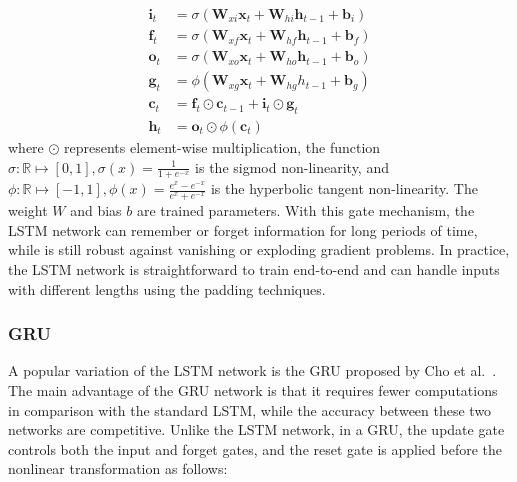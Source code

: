 \begin{equation}
\label{Eq_LSTM} 
\begin{aligned} 
{\mathbf{i}_t} &= \sigma ({\mathbf{W}_{xi}}{\mathbf{x}_t} + {\mathbf{W}_{hi}}{\mathbf{h}_{t - 1}} + {\mathbf{b}_i})\\
{\mathbf{f}_t} &= \sigma ({\mathbf{W}_{xf}}{\mathbf{x}_t} + {\mathbf{W}_{hf}}{\mathbf{h}_{t - 1}} + {\mathbf{b}_f})\\
{\mathbf{o}_t} &= \sigma ({\mathbf{W}_{xo}}{\mathbf{x}_t} + {\mathbf{W}_{ho}}{\mathbf{h}_{t - 1}} + {\mathbf{b}_o})\\
{\mathbf{g}_t} &= \phi ({\mathbf{W}_{xg}}{\mathbf{x}_t} + {\mathbf{W}_{hg}}{h_{t - 1}} + {\mathbf{b}_g})\\
{\mathbf{c}_t} &= {\mathbf{f}_t} \odot {\mathbf{c}_{t - 1}} + {\mathbf{i}_t} \odot {\mathbf{g}_t}\\
{\mathbf{h}_t} &= {\mathbf{o}_t} \odot \phi ({\mathbf{c}_t})
\end{aligned}
\end{equation}
where $\odot$ represents element-wise multiplication, the function $\sigma: \mathbb{R} \mapsto [0,1], \sigma (x) = \frac{1}{{1 + {e^{ - x}}}}$ is the sigmod non-linearity, and $\phi: \mathbb{R} \mapsto [ - 1,1], \phi (x) = \frac{{{e^x} - {e^{ - x}}}}{{{e^x} + {e^{ - x}}}}$ is the hyperbolic tangent non-linearity. The weight $W$ and bias $b$ are trained parameters. With this gate mechanism, the LSTM network can remember or forget information for long periods of time, while is still robust against vanishing or exploding gradient problems. In practice, the LSTM network is straightforward to train end-to-end and can handle inputs with different lengths using the padding techniques.

\subsubsection{GRU}
A popular variation of the LSTM network is the GRU proposed by Cho et al.~\cite{Cho14_GRU}. The main advantage of the GRU network is that it requires fewer computations in comparison with the standard LSTM, while the accuracy between these two networks are competitive. Unlike the LSTM network, in a GRU, the update gate controls both the input and forget gates, and the reset gate is applied before the nonlinear transformation as follows:

